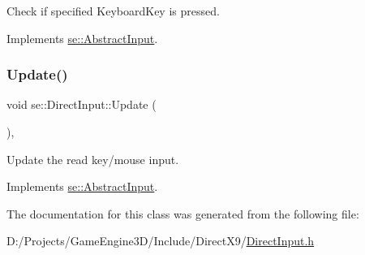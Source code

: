 Check if specified Keyboard\+Key is pressed. 

Implements \mbox{\hyperlink{classse_1_1_abstract_input_a4375b92281cee63064c898a791ddd1a3}{se\+::\+Abstract\+Input}}.

\mbox{\label{classse_1_1_direct_input_a863123d7304364a55fd2135f27195500}} 
\subsubsection{\texorpdfstring{Update()}{Update()}}
{\footnotesize\ttfamily void se\+::\+Direct\+Input\+::\+Update (\begin{DoxyParamCaption}{ }\end{DoxyParamCaption})\hspace{0.3cm}{\ttfamily [override]}, {\ttfamily [virtual]}}

Update the read key/mouse input. 

Implements \mbox{\hyperlink{classse_1_1_abstract_input_a7c9b63e9df453d38c035fb9fa91c0d70}{se\+::\+Abstract\+Input}}.



The documentation for this class was generated from the following file\+:\begin{DoxyCompactItemize}
\item 
D\+:/\+Projects/\+Game\+Engine3\+D/\+Include/\+Direct\+X9/\mbox{\hyperlink{_direct_input_8h}{Direct\+Input.\+h}}\end{DoxyCompactItemize}
